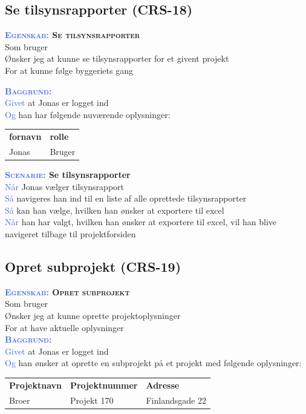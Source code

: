 \subsection{Se tilsynsrapporter (CRS-18)} \label{sec:USTilsynsrapport}
\textbf{\textsc{\textcolor{RoyalBlue}{Egenskab:} Se tilsynsrapporter}}\\
Som bruger\\
Ønsker jeg at kunne se tilsynsrapporter for et givent projekt\\
For at kunne følge byggeriets gang

\textsc{\textcolor{RoyalBlue}{\textbf{Baggrund:}}}\\
\textcolor{RoyalBlue}{Givet} at Jonas er logget ind\\
\textcolor{RoyalBlue}{Og} han har følgende nuværende oplysninger:\\
\begin{tabular}{| l | l |}
	\textbf{fornavn} & \textbf{rolle} \\
	Jonas & Bruger\\
\end{tabular}
\newline

\textbf{\textsc{\textcolor{RoyalBlue}{Scenarie:}} Se tilsynsrapporter}\\
\textcolor{RoyalBlue}{Når} Jonas vælger tilsynsrapport\\
\textcolor{RoyalBlue}{Så} navigeres han ind til en liste af alle oprettede tilsynsrapporter\\
\textcolor{RoyalBlue}{Så} kan han vælge, hvilken han ønsker at exportere til excel\\
\textcolor{RoyalBlue}{Når} han har valgt, hvilken han ønsker at exportere til excel, vil han blive navigeret tilbage til projektforsiden\\

\subsection{Opret subprojekt (CRS-19)} \label{sec:USOpretSubEntreprise}
\textbf{\textsc{\textcolor{RoyalBlue}{Egenskab:} Opret subprojekt}}\\
Som bruger\\
Ønsker jeg at kunne oprette projektoplysninger\\
For at have aktuelle oplysninger \\

\textsc{\textcolor{RoyalBlue}{\textbf{Baggrund:}}}\\
\textcolor{RoyalBlue}{Givet} at Jonas er logget ind\\
\textcolor{RoyalBlue}{Og} han ønsker at oprette en subprojekt på et projekt med følgende oplysninger:\\
\begin{tabular}{| l | l | l |}
	\textbf{Projektnavn} & \textbf{Projektnummer} & \textbf{Adresse} \\
	Broer & Projekt 170 & Finlandsgade 22 \\
\end{tabular}
\newline \newline

